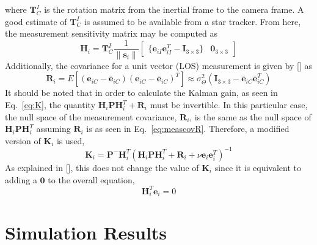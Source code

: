 \documentclass[]{aiaa-tc}%
\begin{document}
%
where $\textbf{T}_C^I$ is the rotation matrix from the inertial frame to the camera frame.  A good estimate of $\textbf{T}_{C}^I$  is assumed to be available from a star tracker.  From here, the measurement sensitivity matrix may be computed as
%
\begin{equation}
\label{eq:H}
\textbf{H}_{i}=\textbf{T}_{C}^I\frac{1}{\|\textbf{s}_i\|}
\left[\begin{matrix}
\{\textbf{e}_{iI}\textbf{e}_{iI}^T-\textbf{I}_{3\times3}\} & \textbf{0}_{3\times3}
\end{matrix}\right]
\end{equation}
%
Additionally, the covariance for a unit vector (LOS) measurement is given by [] as
\begin{equation}\label{eq:meascovR}
	\textbf{R}_{i}=E[(\textbf{e}_{iC}-\bar{\textbf{e}}_{iC})(\textbf{e}_{iC}-\bar{\textbf{e}}_{iC})^T]\approx\sigma_\Theta^2(\textbf{I}_{3\times3}-\bar{\textbf{e}}_{iC}\bar{\textbf{e}}_{iC}^T)
\end{equation}
It should be noted that in order to calculate the Kalman gain, as seen in Eq.~\ref{eq:K}, the quantity $\textbf{H}_i\textbf{P}\textbf{H}_i^T+\textbf{R}_i$ must be invertible.  In this particular case, the null space of the measurement covariance, $\textbf{R}_{i}$, is the same as the null space of $\textbf{H}_i\textbf{P}\textbf{H}_i^T$ assuming $\textbf{R}_i$ is as seen in Eq.~\ref{eq:meascovR}.  Therefore, a modified version of $\textbf{K}_i$ is used,
%
\begin{equation} \label{eq:Knew}
\textbf{K}_i=\textbf{P}^-\textbf{H}_i^T(\textbf{H}_i\textbf{P}\textbf{H}_i^T+\textbf{R}_i+\nu\textbf{e}_i\textbf{e}_i^T)^{-1}
\end{equation}
%
As explained in [], this does not change the value of $\textbf{K}_i$ since it is equivalent to adding a $\textbf{0}$ to the overall equation,
%
\begin{equation} \label{eq:Htranse}
\textbf{H}_i^T\textbf{e}_i=0
\end{equation}
%


\section{Simulation Results}
\end{document}
